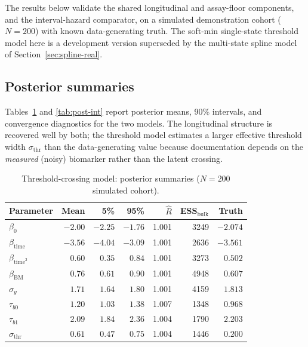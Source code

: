 \documentclass[11pt]{article}
\begin{document}
The results below validate the shared longitudinal and assay-floor components,
and the interval-hazard comparator, on a simulated demonstration cohort
($N=200$) with known data-generating truth. The soft-min single-state threshold
model here is a development version superseded by the multi-state spline model of
Section~\ref{sec:spline-real}.

\subsection{Posterior summaries}
Tables~\ref{tab:post-thr} and \ref{tab:post-int} report posterior means, 90\%
intervals, and convergence diagnostics for the two models. The longitudinal
structure is recovered well by both; the threshold model estimates a larger
effective threshold width $\sigma_{\mathrm{thr}}$ than the data-generating
value because documentation depends on the \emph{measured} (noisy) biomarker
rather than the latent crossing.

\begin{table}[H]
\centering
\caption{Threshold-crossing model: posterior summaries ($N=200$ simulated cohort).}
\label{tab:post-thr}
\begin{tabular}{lrrrrrr}
\toprule
Parameter & Mean & 5\% & 95\% & $\widehat R$ & ESS$_{\mathrm{bulk}}$ & Truth\\
\midrule
$\beta_0$              & $-2.00$ & $-2.25$ & $-1.76$ & 1.001 & 3249 & $-2.074$\\
$\beta_{\mathrm{time}}$& $-3.56$ & $-4.04$ & $-3.09$ & 1.001 & 2636 & $-3.561$\\
$\beta_{\mathrm{time}^2}$& $0.60$ & $0.35$ & $0.84$ & 1.001 & 3273 & $0.502$\\
$\beta_{\mathrm{BM}}$  & $0.76$ & $0.61$ & $0.90$ & 1.001 & 4948 & $0.607$\\
$\sigma_y$             & $1.71$ & $1.64$ & $1.80$ & 1.001 & 4159 & $1.813$\\
$\tau_{b0}$            & $1.20$ & $1.03$ & $1.38$ & 1.007 & 1348 & $0.968$\\
$\tau_{b1}$            & $2.09$ & $1.84$ & $2.36$ & 1.004 & 1790 & $2.203$\\
$\sigma_{\mathrm{thr}}$& $0.61$ & $0.47$ & $0.75$ & 1.004 & 1446 & $0.200$\\
\bottomrule
\end{tabular}
\end{table}
\end{document}
